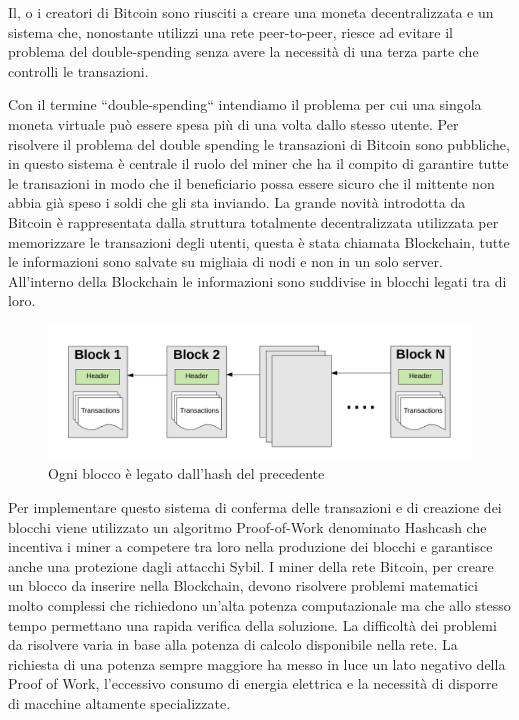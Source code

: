 \documentclass[12pt]{report}
\begin{document}
Il, o i creatori di Bitcoin sono riusciti a creare una moneta decentralizzata e un sistema che, nonostante utilizzi una rete peer-to-peer, riesce ad evitare il problema del double-spending senza avere la necessità di una terza parte che controlli le transazioni.

Con il termine ``double-spending`` intendiamo il problema per cui una singola moneta virtuale può essere spesa più di una volta dallo stesso utente.
Per risolvere il problema del double spending le transazioni di Bitcoin sono pubbliche, in questo sistema è centrale il ruolo del miner che ha il compito di garantire tutte le transazioni in modo che il beneficiario possa essere sicuro che il mittente non abbia già speso i soldi che gli sta inviando.
La grande novità introdotta da Bitcoin è rappresentata dalla struttura totalmente decentralizzata utilizzata per memorizzare le transazioni degli utenti, questa è stata chiamata Blockchain, tutte le informazioni sono salvate su migliaia di nodi e non in un solo server.
All'interno della Blockchain le informazioni sono suddivise in blocchi legati tra di loro.

\begin{figure}[H]
    \includegraphics[width=\textwidth]{Blocks}
    \caption{Ogni blocco è legato dall'hash del precedente}
\end{figure}

Per implementare questo sistema di conferma delle transazioni e di creazione dei blocchi viene utilizzato un algoritmo Proof-of-Work denominato Hashcash che incentiva i miner a competere tra loro nella produzione dei blocchi e garantisce anche una protezione dagli attacchi Sybil.
I miner della rete Bitcoin, per creare un blocco da inserire nella Blockchain, devono risolvere problemi matematici molto complessi che richiedono un'alta potenza computazionale ma che allo stesso tempo permettano una rapida verifica della soluzione.
La difficoltà dei problemi da risolvere varia in base alla potenza di calcolo disponibile nella rete. La richiesta di una potenza sempre maggiore ha messo in luce un lato negativo della Proof of Work, l'eccessivo consumo di energia elettrica e la necessità di disporre di macchine altamente specializzate.
\end{document}
